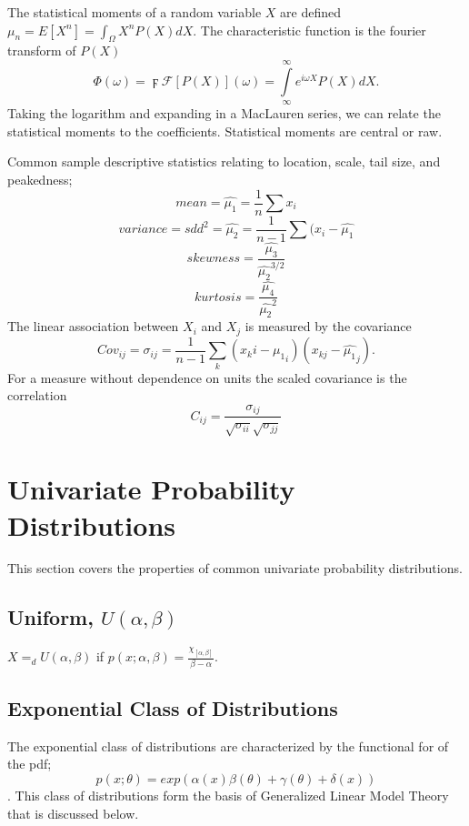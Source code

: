 
The statistical moments of a random variable $X$ are defined $\mu_n = E [ X^n] = \int_\Omega X^n P(X)dX$.  The characteristic function is the fourier transform of $P(X)$ \[\Phi(\omega)=\digamma \mathcal{F} [P(X)] (\omega) = \int\limits_{\infty}^{\infty} e^{i \omega X} P(X) dX.\]  Taking the logarithm and expanding in a MacLauren series, we can relate the statistical moments to the coefficients. Statistical moments are central or raw.

Common sample descriptive statistics relating to location, scale, tail size,  and peakedness;
\[ mean = \hat{\mu_1} = \frac{1}{n}\sum x_i  \]
\[ variance = sdd^2 =  \hat{\mu_2} = \frac{1}{n-1} \sum (x_i- \hat{\mu_1}\]
\[ skewness = \frac{ \hat{\mu_3}}{\hat{\mu_2}^{3/2}} \]
\[ kurtosis = \frac{\hat{\mu_4}}{\hat{\mu_2}^2} \]
The linear association between $X_i$ and $X_j$ is measured by the covariance \[ Cov_{ij} = \sigma_{ij} = \frac{1}{n-1} \sum_k (x_ki - \hat{\mu_1}_i)(x_{kj} - \hat{\mu_1}_j). \]  For a measure without dependence on units the scaled covariance is the correlation \[C_{ij} =\frac{\sigma_{ij}}{\sqrt{\sigma_{ii}}\sqrt{\sigma_{jj}}}\]

\section*{Univariate Probability Distributions}
This section covers the properties of common univariate
probability distributions.

\subsection{Uniform,  $U(\alpha,\beta)$}
$X=_d U(\alpha,\beta)$ if $p(x; \alpha, \beta)=
\frac{\chi_{[\alpha,\beta]}}{\beta-\alpha}.$

\subsection{Exponential Class of Distributions}
The exponential class of distributions are characterized by the
functional for of the pdf; \[ p(x;\theta) =
exp(\alpha(x)\beta(\theta)+\gamma(\theta)+\delta(x) ) \].  This
class of distributions form the basis of Generalized Linear
Model Theory that is discussed below.

